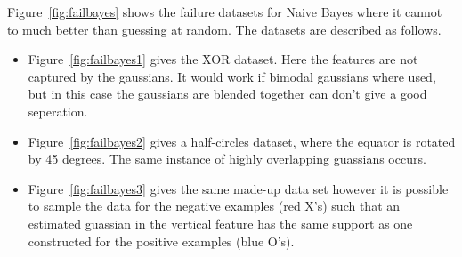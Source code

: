 \documentclass[letterpaper,10pt]{article} %
\begin{document}
Figure~\ref{fig:failbayes} shows the failure datasets for Naive Bayes where it cannot to much better than guessing at random. The datasets are described as follows.

\begin{itemize}
\item Figure~\ref{fig:failbayes1} gives the XOR dataset. Here the features are not captured by the gaussians. It would work if bimodal gaussians where used, but in this case the gaussians are blended together can don't give a good seperation.
\item Figure~\ref{fig:failbayes2} gives a half-circles dataset, where the equator is rotated by 45 degrees. The same instance of highly overlapping guassians occurs.
\item Figure~\ref{fig:failbayes3} gives the same made-up data set however it is possible to sample the data for the negative examples (red X's) such that an estimated guassian in the vertical feature has the same support as one constructed for the positive examples (blue O's).
\end{itemize}
\end{document}
